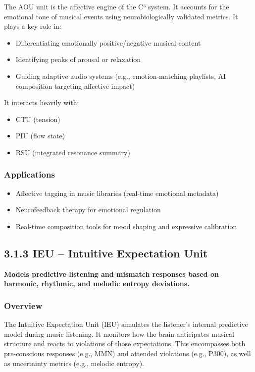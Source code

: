 \documentclass[10pt]{article}
\begin{document}
The AOU unit is the affective engine of the C³ system. It accounts for the emotional tone of musical events using neurobiologically validated metrics. It plays a key role in:

\begin{itemize}
    \item Differentiating emotionally positive/negative musical content
    \item Identifying peaks of arousal or relaxation
    \item Guiding adaptive audio systems (e.g., emotion-matching playlists, AI composition targeting affective impact)
\end{itemize}

It interacts heavily with:

\begin{itemize}
    \item CTU (tension)
    \item PIU (flow state)
    \item RSU (integrated resonance summary)
\end{itemize}

\subsubsection*{Applications}

\begin{itemize}
    \item Affective tagging in music libraries (real-time emotional metadata)
    \item Neurofeedback therapy for emotional regulation
    \item Real-time composition tools for mood shaping and expressive calibration
\end{itemize}

\subsection*{3.1.3 IEU – Intuitive Expectation Unit}

\textbf{Models predictive listening and mismatch responses based on harmonic, rhythmic, and melodic entropy deviations.}

\subsubsection*{Overview}

The Intuitive Expectation Unit (IEU) simulates the listener’s internal predictive model during music listening. It monitors how the brain anticipates musical structure and reacts to violations of those expectations. This encompasses both pre-conscious responses (e.g., MMN) and attended violations (e.g., P300), as well as uncertainty metrics (e.g., melodic entropy).
\end{document}
